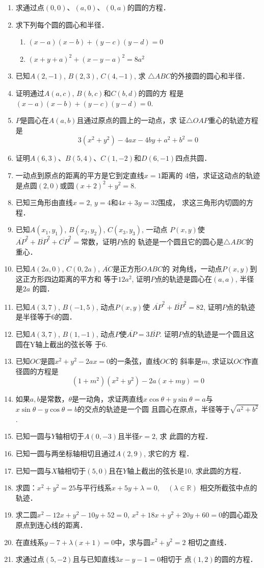 \begin{enumerate}

\item 求通过点$(0,0)$、$(a,0)$、$(0,a)$的圆的方程．
\item 求下列每个圆的圆心和半径．
\begin{enumerate}
    \item $(x-a)(x-b)+(y-c)(y-d)=0$
    \item $(x+y+a)^2+(x-y-a)^2=8a^2$
\end{enumerate}

\item 已知$A(2,-1)$, $B(2,3)$, $C(4,-1)$, 求
$\triangle ABC$的外接圆的圆心和半径．
\item 证明通过$A(a,c)$, $B(b,c)$和$C(b,d)$的圆的方
程是$(x-a)(x-b)+(y-c)(y-d)=0$.
\item $P$是圆心在$A(a,b)$且通过原点的圆上的一动点，求
证$\triangle OAP$重心的轨迹方程是
\[3(x^2+y^2)-4ax-4by+a^2+b^2=0\]
\item 证明$A(6,3)$、$B(5,4)$、$C(1,-2)$和$D(6,
-1)$四点共圆．
\item 一动点到原点的距离的平方是它到定直线$x=1$距离的
4倍，求证这动点的轨迹是点圆$(2,0)$或圆$(x+2)^2
+y^2=8$.
\item 已知三角形由直线$x=2$, $y=4$和$4x+3y=32$围成，
求这三角形内切圆的方程．
\item 已知$A(x_1,y_1)$, $B(x_2,y_2)$, $C(x_3,y_3)$, 一动点
$P(x,y)$使$\overline{AP}^2+\overline{BP}^2+\overline{CP}^2=$常数，证明$P$点的
轨迹是一个圆且它的圆心是$\triangle ABC$的重心．
\item 已知$A(2a,0)$, $C(0,2a)$, $\overline{AC}$是正方形$OABC$的
对角线，一动点$P(x,y)$到这正方形四边距离的平方和
等于$12a^2$, 证明$P$点的轨迹是圆心在$(a,a)$, 半径是$2a$
的圆．
\item 已知$A(3,7)$, $B(-1,5)$, 动点$P(x,y)$使
$\overline{AP}^2+\overline{BP}^2=82$, 证明$P$点的轨迹是半径等于6的圆．
\item 已知$A(3,7)$, $B(1,-1)$, 动点$P$使$\overline{AP}=3\overline{BP}$. 
证明$P$点的轨迹是一个圆且这圆在Y轴上截出的弦长等
于6.
\item 已知$OC$是圆$x^2+y^2-2ax=0$的一条弦，直线$OC$的
斜率是$m$, 求证以$OC$作直径圆的方程是
\[(1+m^2)(x^2+y^2)-2a(x+my)=0\]
\item 如果$a,b$是常数，$\theta$是一动角，求证两直线$x\cos\theta+
y\sin\theta=a$与$x\sin\theta-y\cos\theta=b$的交点的轨迹是一个圆
且圆心在原点，半径等于$\sqrt{a^2+b^2}$.
\item 已知一圆与$Y$轴相切于$A(0,-3)$且半径$r=2$, 求
此圆的方程．
\item 已知一圆与两坐标轴相切且通过$A(2,9)$, 求它的方
程．
\item 已知一圆与$X$轴相切于$(5,0)$且在$Y$轴上截出的弦长是10, 求此圆的方程．
\item 求圆：$x^2+y^2=25$与平行线系$x+5y+\lambda=0,\quad (\lambda\in\mathbb{R})$
相交所截弦中点的轨迹．
\item 求二圆$x^2-12x+y^2-10y+52=0$, $x^2+18x+y^2+
20y+60=0$的圆心距及原点到连心线的距离．
\item 在直线系$y-7+\lambda(x+1)=0$中，求与圆$x^2+y^2=2$
相切之直线．
\item 求通过点$(5,-2)$且与已知直线$3x-y-1=0$相切于
点$(1,2)$的圆的方程．
\end{enumerate}

